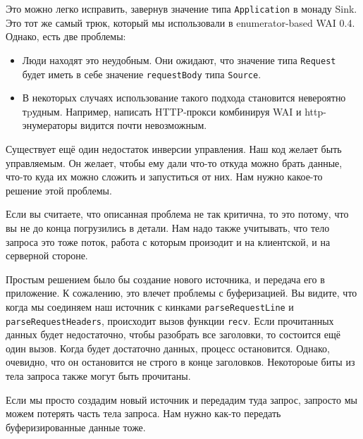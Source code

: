 {Это можно легко исправить, завернув значение типа \lstinline'Application' в монаду Sink. 
Это тот же самый трюк, который мы использовали в enumerator-based WAI 0.4. 
Однако, есть две проблемы:

\begin{itemize}
\item Люди находят это неудобным. Они ожидают, что значение типа 
\lstinline'Request' будет иметь в себе значение \lstinline'requestBody' типа 
\lstinline'Source'.
\item В некоторых случаях использование такого подхода становится невероятно 
тpудным. Например, написать HTTP-прокси комбинируя WAI и http-энумераторы 
видится почти невозможным.
\end{itemize}
Существует ещё один недостаток инверсии управления. Наш код желает быть 
управляемым. Он желает, чтобы ему дали что-то откуда можно брать данные, что-то 
куда их можно сложить и запуститься от них. Нам нужно какое-то решение этой проблемы.

\begin{remark}
Если вы считаете, что описанная проблема не так критична, то это потому, что вы не до
 конца погрузились в детали. Нам надо также учитывать, что тело запроса это тоже поток,
работа с которым произодит и на клиентской, и на серверной стороне.
\end{remark}

Простым решением было бы создание нового источника, и передача его в приложение.
К сожалению, это влечет проблемы с буферизацией. Вы видите, что когда мы соединяем 
наш источник с кинками \lstinline'parseRequestLine' и \lstinline'parseRequestHeaders',
происходит вызов функции \lstinline'recv'.
Если прочитанных данных будет недостаточно, чтобы разобрать все заголовки, то 
состоится ещё один вызов. Когда будет достаточно данных, процесс остановится. 
Однако, очевидно, что он остановится не строго в конце заголовков. Некотороые 
биты из тела запроса также могут быть прочитаны.

Если мы просто создадим новый источник и передадим туда запрос, запросто мы можем 
потерять часть тела запроса. Нам нужно как-то передать буферизированные данные 
тоже.

}
